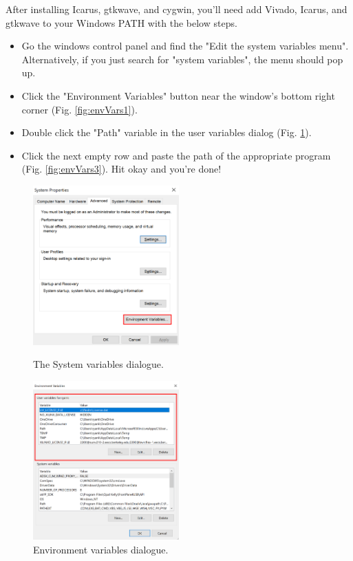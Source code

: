 \documentclass[11pt]{article}
\begin{document}
After installing Icarus, gtkwave, and cygwin, you'll need add Vivado, Icarus, and gtkwave to your Windows PATH with the below steps.
\begin{itemize}
    \item Go the windows control panel and find the "Edit the system variables menu". Alternatively, if you just search for "system variables", the menu should pop up.
    \item Click the "Environment Variables" button near the window's bottom right corner (Fig. \ref{fig:envVars1}).
    \item Double click the "Path" variable in the user variables dialog  (Fig. \ref{fig:envVars2}).
    \item Click the next empty row and paste the path of the appropriate program  (Fig. \ref{fig:envVars3}). Hit okay and you're done!
\end{itemize}

\begin{figure}[H]
  \centering
  \begin{minipage}{0.5\textwidth}
    \centering
    \includegraphics[width=0.5\textwidth]{figs/environment_variables_1a.png}
    \caption{The System variables dialogue.}
    \label{fig:envVars1}
  \end{minipage}\hfill
  \begin{minipage}{0.5\textwidth}
    \centering
    \includegraphics[width=0.5\textwidth]{figs/environment_variables_2a.png}
    \caption{Environment variables dialogue.}
    \label{fig:envVars2}
  \end{minipage}
\end{figure}
\end{document}
